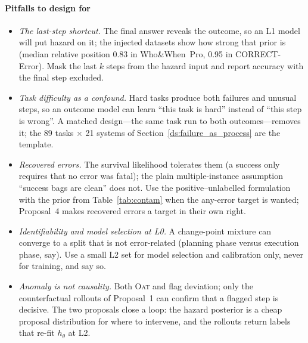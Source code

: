 \documentclass[10pt,a4paper]{article}
\begin{document}
\paragraph{Pitfalls to design for}
\begin{itemize}[leftmargin=1.1em]
\item \emph{The last-step shortcut.} The final answer reveals the outcome, so an L1 model will put hazard on it; the injected datasets show how strong that prior is (median relative position 0.83 in Who\&When~Pro, 0.95 in CORRECT-Error). Mask the last $k$ steps from the hazard input and report accuracy with the final step excluded.
\item \emph{Task difficulty as a confound.} Hard tasks produce both failures and unusual steps, so an outcome model can learn ``this task is hard'' instead of ``this step is wrong''. A matched design---the same task run to both outcomes---removes it; the 89 tasks $\times$ 21 systems of Section~\ref{ds:failure_as_process} are the template.
\item \emph{Recovered errors.} The survival likelihood tolerates them (a success only requires that no error was fatal); the plain multiple-instance assumption ``success bags are clean'' does not. Use the positive--unlabelled formulation with the prior from Table~\ref{tab:contam} when the any-error target is wanted; Proposal~4 makes recovered errors a target in their own right.
\item \emph{Identifiability and model selection at L0.} A change-point mixture can converge to a split that is not error-related (planning phase versus execution phase, say). Use a small L2 set for model selection and calibration only, never for training, and say so.
\item \emph{Anomaly is not causality.} Both \textsc{Oat} and  flag deviation; only the counterfactual rollouts of Proposal~1 can confirm that a flagged step is decisive. The two proposals close a loop: the hazard posterior is a cheap proposal distribution for where to intervene, and the rollouts return labels that re-fit $h_\theta$ at L2.
\end{itemize}
\end{document}
